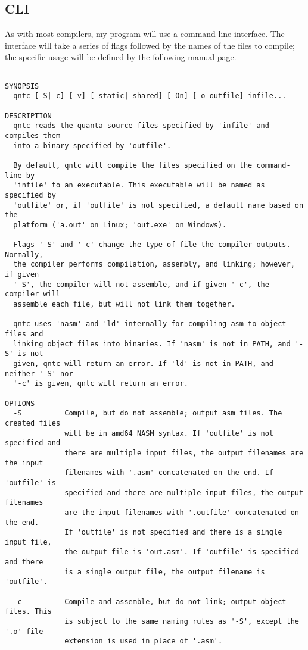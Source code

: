\documentclass[9pt]{extarticle}
\begin{document}
\subsection{CLI}

As with most compilers, my program will use a command-line interface.
The interface will take a series of flags followed by the names of the
files to compile; the specific usage will be defined by the following
manual page.

\begin{verbatim}

SYNOPSIS
  qntc [-S|-c] [-v] [-static|-shared] [-On] [-o outfile] infile...

DESCRIPTION
  qntc reads the quanta source files specified by 'infile' and compiles them
  into a binary specified by 'outfile'.

  By default, qntc will compile the files specified on the command-line by
  'infile' to an executable. This executable will be named as specified by
  'outfile' or, if 'outfile' is not specified, a default name based on the
  platform ('a.out' on Linux; 'out.exe' on Windows).

  Flags '-S' and '-c' change the type of file the compiler outputs.  Normally,
  the compiler performs compilation, assembly, and linking; however, if given
  '-S', the compiler will not assemble, and if given '-c', the compiler will
  assemble each file, but will not link them together.

  qntc uses 'nasm' and 'ld' internally for compiling asm to object files and
  linking object files into binaries. If 'nasm' is not in PATH, and '-S' is not
  given, qntc will return an error. If 'ld' is not in PATH, and neither '-S' nor
  '-c' is given, qntc will return an error.

OPTIONS
  -S          Compile, but do not assemble; output asm files. The created files
              will be in amd64 NASM syntax. If 'outfile' is not specified and
              there are multiple input files, the output filenames are the input
              filenames with '.asm' concatenated on the end. If 'outfile' is
              specified and there are multiple input files, the output filenames
              are the input filenames with '.outfile' concatenated on the end.
              If 'outfile' is not specified and there is a single input file,
              the output file is 'out.asm'. If 'outfile' is specified and there
              is a single output file, the output filename is 'outfile'.

  -c          Compile and assemble, but do not link; output object files. This
              is subject to the same naming rules as '-S', except the '.o' file
              extension is used in place of '.asm'.


\end{verbatim}
\end{document}
